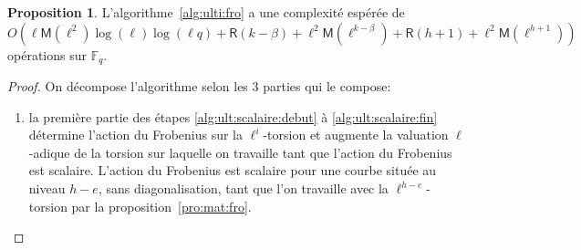 \documentclass[10pt,a4paper]{book}
\theoremstyle{plain}
\theoremstyle{definition}
\theoremstyle{definition}
\theoremstyle{definition}
\newtheorem{prop}[thm]{Proposition}
\theoremstyle{definition}
\theoremstyle{remark}
\theoremstyle{remark}
\theoremstyle{definition}
\begin{document}
\begin{prop}
\label{pro:alg:ulti}
L'algorithme~\ref{alg:ulti:fro} a une complexité espérée de
\[O(\ell\mathsf{M}(\ell^2)\log(\ell)\log(\ell q)+\mathsf{R}(k-\beta) + \ell^2
\mathsf{M}(\ell^{k-\beta})+\mathsf{R}(h+1)+\ell^2 \mathsf{M}(\ell^{h+1}))\] 
opérations sur $\mathbb{F}_q$.
\end{prop}
\begin{proof}
On décompose l'algorithme selon les 3 parties qui le compose: 
\begin{enumerate}
\item la première partie des étapes \ref{alg:ult:scalaire:debut} à 
\ref{alg:ult:scalaire:fin} détermine l'action du Frobenius sur la $\ell^i$-torsion 
et augmente la valuation $\ell$-adique de la torsion sur laquelle on travaille 
tant que l'action du Frobenius est scalaire. L'action du Frobenius est scalaire 
pour une courbe située au niveau $h-e$, sans diagonalisation, tant que l'on 
travaille avec la $\ell^{h-e}$-torsion par la proposition~\ref{pro:mat:fro}.


\end{enumerate}
\end{proof}
\end{document}
